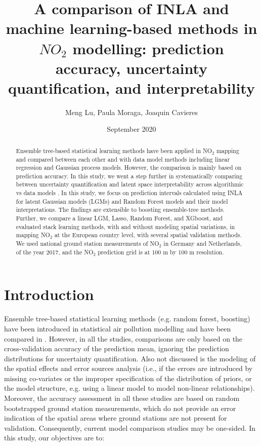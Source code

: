 \documentclass{article}
\author{Meng Lu, Paula Moraga, Joaquin Cavieres }
\date{September 2020}
\title{A comparison of INLA and machine learning-based methods in $NO_2$ modelling: prediction accuracy, uncertainty quantification, and interpretability }
\begin{document}
\maketitle
\begin{abstract} 
Ensemble tree-based statistical learning methods have been applied in NO$_2$ mapping and compared between each other and with data model methods including linear regression and Gaussian process models. However, the comparison is mainly based on prediction accuracy. In this study, we went a step further in systematically comparing between uncertainty quantification and latent space interpretability across algorithmic vs data models \citep{breiman2001statistical}. In this study, we focus on prediction intervals calculated using INLA \citep{blangiardo2015spatial} for latent Gaussian models (LGMs) and Random Forest models and their model interpretations. The findings are extensible to boosting ensemble-tree methods. Further, we compare a linear LGM, Lasso, Random Forest, and XGboost, and evaluated stack learning methods, with and without modeling spatial variations, in mapping NO$_2$ at the European country level, with several spatial validation methods. We used national ground station measurements of NO$_2$ in Germany and Netherlands, of the year 2017, and the NO$_2$ prediction grid is at 100 m by 100 m resolution.  
\end{abstract}

\section{Introduction}
Ensemble tree-based statistical learning methods (e.g. random forest, boosting) have been introduced in statistical air pollution modelling and have been compared in \cite{chen2019comparison,kerckhoffs2019performance,luglobal}. However, in all the studies, comparisons are only based on the cross-validation accuracy of the prediction mean, ignoring the prediction distributions for uncertainty quantification. Also not discussed is the modeling of the spatial effects and error sources analysis (i.e., if the errors are introduced by missing co-variates or the improper specification of the distribution of priors, or the model structure, e.g. using a linear model to model non-linear relationships). Moreover, the accuracy assessment in all these studies are based on random bootstrapped ground station measurements, which do not provide an error indication of the spatial areas where ground stations are not present for validation. Consequently, current model comparison studies may be one-sided. In this study, our objectives are to:
\end{document}
